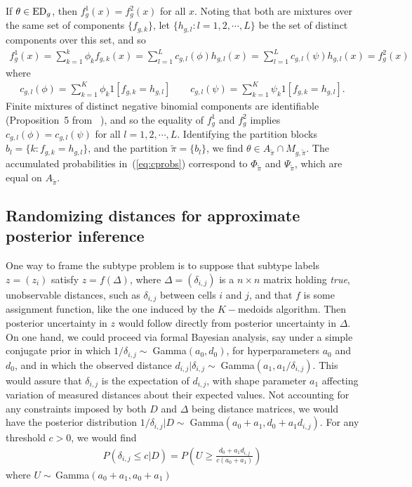 \documentclass[aoas,preprint]{imsart}
\begin{document}
If $\theta \in {\mbox {\rm ED}}_g$, then $f^1_g(x) = f^2_g(x)$ for all $x$.  Noting that both are mixtures over
the same set of components $\{ f_{g,k} \}$, let $\{ h_{g,l} : l=1,2, \cdots, L\}$ be the set of distinct 
components over this set, and so
\begin{eqnarray*}
f^1_g(x) = \sum_{k=1}^k \phi_k f_{g,k}(x)   
         = \sum_{l=1}^L c_{g,l} (\phi) h_{g,l}(x) 
         = \sum_{l=1}^L c_{g,l} (\psi) h_{g,l}(x) 
         = f^2_g(x ) 
\end{eqnarray*}
where
\begin{eqnarray}
\label{eq:cprobs}
c_{g,l}(\phi) = \sum_{k=1}^K \phi_k 1[ f_{g,k} = h_{g,l} ]   \qquad
c_{g,l}(\psi) = \sum_{k=1}^K \psi_k 1[ f_{g,k} = h_{g,l} ]  .
\end{eqnarray}
Finite mixtures of distinct negative binomial components are identifiable (Proposition~5 from ~\cite{yak68}), 
and so the equality
of $f^1_g$ and $f^2_g$ implies $c_{g,l} (\phi) = c_{g,l} (\psi)$ for all $l=1,2, \cdots, L$.  
Identifying the partition blocks $b_l = \{ k: f_{g,k} = h_{g,l} \}$, and the partition $\tilde \pi = \{b_l\}$,
we find $\theta \in A_{\tilde \pi} \cap M_{g, \tilde \pi}$. The accumulated probabilities in~(\ref{eq:cprobs})
correspond to $\Phi_{\tilde \pi}$ and $\Psi_{\tilde \pi}$, which are equal on $A_{\tilde \pi}$.


\subsection*{Randomizing distances for approximate posterior inference}

One way to frame the subtype problem is to suppose that subtype labels $z = (z_i)$ satisfy
 $z=f(\Delta)$, where $\Delta = \left( \delta_{i,j} \right)$ is
a $n \times n$  matrix holding {\em true}, unobservable distances, such as  $\delta_{i,j}$ between cells $i$ and $j$, 
and that $f$ is some assignment
function, like the one 
induced by the $K-$medoids algorithm.  Then posterior uncertainty in $z$ would follow 
directly from  posterior uncertainty in $\Delta$.  On one hand, 
we could proceed via formal Bayesian analysis, say under
a simple conjugate prior in which $1/\delta_{i,j} \sim \; $Gamma$(a_0,d_0)$, for hyperparameters
$a_0$ and $d_0$, and in which the observed distance
$d_{i,j} | \delta_{i,j} \sim \; $Gamma$(a_1, a_1/\delta_{i,j})$.  This would assure that $\delta_{i,j}$ is
the expectation of $d_{i,j}$, with shape  parameter $a_1$ affecting variation of measured distances
about their expected values.  Not accounting
for any constraints imposed by both $D$ and $\Delta$ being distance matrices, we would have the 
posterior distribution $1/\delta_{i,j} | D \sim \; $Gamma$(a_0+a_1,  d_0 + a_1 d_{i,j} )$.  For any threshold
$c>0$, we would find
\begin{eqnarray}
\label{eq:rw}
P\left( \delta_{i,j} \leq c | D \right) = P\left( U \geq  \frac{  d_0+a_1 d_{i,j}}{c(a_0+a_1)} \right)
\end{eqnarray}
where $U \sim \, $Gamma$(a_0+a_1, a_0+a_1)$
\end{document}
